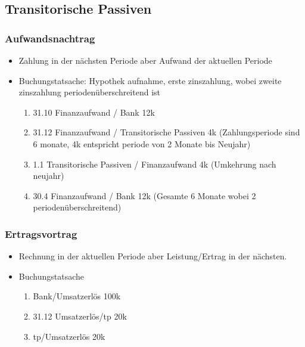 \subsection{Transitorische Passiven}

\subsubsection{Aufwandsnachtrag}
\begin{itemize}
    \item Zahlung in der nächsten Periode aber Aufwand der aktuellen Periode
    \item Buchungstatsache: Hypothek aufnahme, erste zinszahlung,  wobei zweite zinszahlung periodenüberschreitend ist
    \begin{enumerate}
        \item 31.10 Finanzaufwand / Bank 12k 
        \item 31.12 Finanzaufwand / Transitorische Passiven 4k (Zahlungsperiode sind 6 monate, 4k entspricht periode von 2 Monate bis Neujahr)
        \item 1.1 Transitorische Passiven / Finanzaufwand 4k (Umkehrung nach neujahr)
        \item 30.4 Finanzaufwand / Bank 12k (Gesamte 6 Monate wobei 2 periodenüberschreitend)
    \end{enumerate}
\end{itemize}

\subsubsection{Ertragsvortrag}

\begin{itemize}
    \item Rechnung in der aktuellen Periode aber Leistung/Ertrag in der nächsten.
    \item Buchungstatsache 
    \begin{enumerate}
        \item Bank/Umsatzerlös 100k
        \item 31.12 Umsatzerlös/tp 20k
        \item tp/Umsatzerlös 20k
    \end{enumerate}
\end{itemize}

